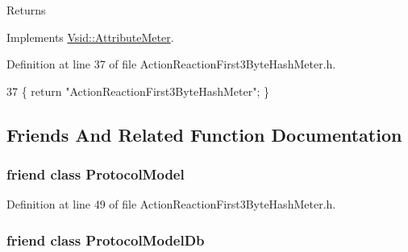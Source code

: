 \begin{DoxyReturn}{Returns}

\end{DoxyReturn}


Implements \hyperlink{class_vsid_1_1_attribute_meter_a24d5a7141e89e948c05edf8f70be8c53}{Vsid\-::\-Attribute\-Meter}.



Definition at line 37 of file Action\-Reaction\-First3\-Byte\-Hash\-Meter.\-h.


\begin{DoxyCode}
37 \{ \textcolor{keywordflow}{return} \textcolor{stringliteral}{"ActionReactionFirst3ByteHashMeter"}; \}
\end{DoxyCode}


\subsection{Friends And Related Function Documentation}
\hypertarget{class_vsid_1_1_action_reaction_first3_byte_hash_meter_a80219b863d4ff3456933d16bc5f73f45}{
\subsubsection[{Protocol\-Model}]{\setlength{\rightskip}{0pt plus 5cm}friend class {\bf Protocol\-Model}\hspace{0.3cm}{\ttfamily [friend]}}}\label{class_vsid_1_1_action_reaction_first3_byte_hash_meter_a80219b863d4ff3456933d16bc5f73f45}


Definition at line 49 of file Action\-Reaction\-First3\-Byte\-Hash\-Meter.\-h.

\hypertarget{class_vsid_1_1_action_reaction_first3_byte_hash_meter_a3c0d389e7a9476b06313d8fb9ca9fe68}{
\subsubsection[{Protocol\-Model\-Db}]{\setlength{\rightskip}{0pt plus 5cm}friend class {\bf Protocol\-Model\-Db}\hspace{0.3cm}{\ttfamily [friend]}}}\label{class_vsid_1_1_action_reaction_first3_byte_hash_meter_a3c0d389e7a9476b06313d8fb9ca9fe68}


